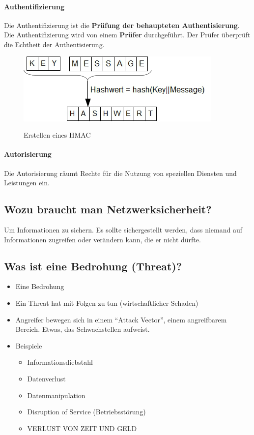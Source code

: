 \paragraph*{Authentifizierung}\label{par:Authentification}\label{para:Authentifizierung}Die Authentifizierung ist die \textbf{Prüfung der behaupteten Authentisierung}. Die Authentifizierung wird von einem \textbf{Prüfer} durchgeführt. Der Prüfer überprüft die Echtheit der Authentisierung.
\begin{figure}[H]
    \begin{center}
    \label{pic:HMAC}
    \includegraphics[width=\textwidth]{images/hmac.png}
    \caption{Erstellen eines HMAC}
    \end{center}
\end{figure}

\paragraph*{Autorisierung}\label{par:Authorization}\label{para:Autorisierung}Die Autorisierung räumt Rechte für die Nutzung von speziellen Diensten und Leistungen ein.

\subsection*{Wozu braucht man Netzwerksicherheit?}
Um Informationen zu sichern. Es sollte sichergestellt werden, dass niemand auf Informationen zugreifen oder verändern kann, die er nicht dürfte.

\subsection*{Was ist eine Bedrohung (Threat)?}
\begin{itemize}
    \item Eine Bedrohung
    \item Ein Threat hat mit Folgen zu tun (wirtschaftlicher Schaden)
    \item Angreifer bewegen sich in einem "`Attack Vector"', einem angreifbarem Bereich. Etwas, das Schwachstellen aufweist.
    \item Beispiele
    \begin{itemize}
        \item Informationsdiebstahl
        \item Datenverlust
        \item Datenmanipulation
        \item Disruption of Service (Betriebsstörung)
        \item VERLUST VON ZEIT UND GELD
    \end{itemize}
\end{itemize}

